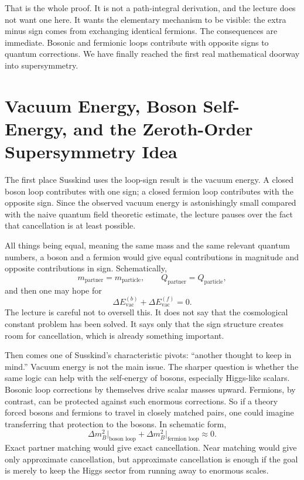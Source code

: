 That is the whole proof. It is not a path-integral derivation, and the lecture does not want one here. It wants the elementary mechanism to be visible: the extra minus sign comes from exchanging identical fermions. The consequences are immediate. Bosonic and fermionic loops contribute with opposite signs to quantum corrections. We have finally reached the first real mathematical doorway into supersymmetry.

\section{Vacuum Energy, Boson Self-Energy, and the Zeroth-Order Supersymmetry Idea}

The first place Susskind uses the loop-sign result is the vacuum energy. A closed boson loop contributes with one sign; a closed fermion loop contributes with the opposite sign. Since the observed vacuum energy is astonishingly small compared with the naive quantum field theoretic estimate, the lecture pauses over the fact that cancellation is at least possible.

All things being equal, meaning the same mass and the same relevant quantum numbers, a boson and a fermion would give equal contributions in magnitude and opposite contributions in sign. Schematically,
\begin{equation}
m_{\text{partner}}=m_{\text{particle}},
\qquad
Q_{\text{partner}}=Q_{\text{particle}},
\end{equation}
and then one may hope for
\begin{equation}
\Delta E_{\mathrm{vac}}^{(b)}+\Delta E_{\mathrm{vac}}^{(f)}=0.
\end{equation}
The lecture is careful not to oversell this. It does not say that the cosmological constant problem has been solved. It says only that the sign structure creates room for cancellation, which is already something important.

Then comes one of Susskind's characteristic pivots: ``another thought to keep in mind.'' Vacuum energy is not the main issue. The sharper question is whether the same logic can help with the self-energy of bosons, especially Higgs-like scalars. Bosonic loop corrections by themselves drive scalar masses upward. Fermions, by contrast, can be protected against such enormous corrections. So if a theory forced bosons and fermions to travel in closely matched pairs, one could imagine transferring that protection to the bosons. In schematic form,
\begin{equation}
\Delta m_B^2\big|_{\text{boson loop}}
+
\Delta m_B^2\big|_{\text{fermion loop}}
\approx 0.
\end{equation}
Exact partner matching would give exact cancellation. Near matching would give only approximate cancellation, but approximate cancellation is enough if the goal is merely to keep the Higgs sector from running away to enormous scales.


